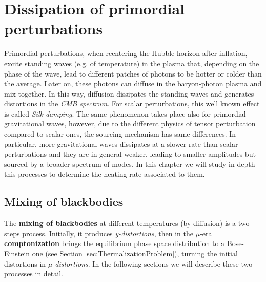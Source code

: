 \chapter{Dissipation of primordial perturbations}\label{chap:dissipation}
\label{sec:dissipation_PGW}
Primordial perturbations, when reentering the Hubble horizon after inflation, excite standing waves (e.g. of temperature) in the plasma that, depending on the phase of the wave, lead to different patches of photons to be hotter or colder than the average. Later on, these photons can diffuse in the baryon-photon plasma and mix together. In this way, diffusion dissipates the standing waves and generates distortions in the \emph{CMB spectrum}. For scalar perturbations, this well known effect is called \emph{Silk damping}. The same phenomenon takes place also for primordial gravitational waves, however, due to the different physics of tensor perturbation compared to scalar ones, the sourcing mechanism has same differences. In particular, more gravitational waves dissipates at a slower rate than scalar perturbations and they are in general weaker, leading to smaller amplitudes but sourced by a broader spectrum of modes. In this chapter we will study in depth this processes to determine the heating rate associated to them.

\section{Mixing of blackbodies}\label{sec:MixingOfBlackbodies}
The \textbf{mixing of blackbodies} at different temperatures (by diffusion) is a two steps process.
Initially, it produces \emph{y-distortions}, then in the $\mu$-era \textbf{comptonization} brings the equilibrium phase space distribution to a Bose-Einstein one (see Section \ref{sec:ThermalizationProblem}), turning the initial distortions in \emph{$\mu$-distortions}. In the following sections we will describe these two processes in detail.

